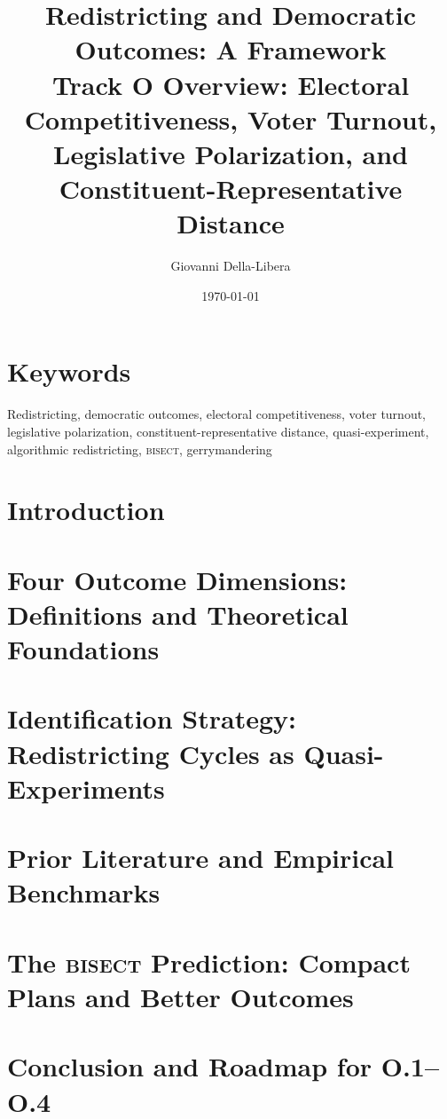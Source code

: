 \documentclass[12pt]{article}
\title{\textbf{Redistricting and Democratic Outcomes: A Framework}\\
\large Track O Overview: Electoral Competitiveness, Voter Turnout,\\
Legislative Polarization, and Constituent-Representative Distance}
\author{Giovanni Della-Libera}
\date{\today}
\begin{document}
\maketitle

\begin{abstract}

\end{abstract}

\section*{Keywords}
Redistricting, democratic outcomes, electoral competitiveness, voter turnout,
legislative polarization, constituent-representative distance, quasi-experiment,
algorithmic redistricting, \textsc{bisect}, gerrymandering

\section{Introduction}


\section{Four Outcome Dimensions: Definitions and Theoretical Foundations}


\section{Identification Strategy: Redistricting Cycles as Quasi-Experiments}


\section{Prior Literature and Empirical Benchmarks}


\section{The \textsc{bisect} Prediction: Compact Plans and Better Outcomes}


\section{Conclusion and Roadmap for O.1--O.4}




\end{document}
